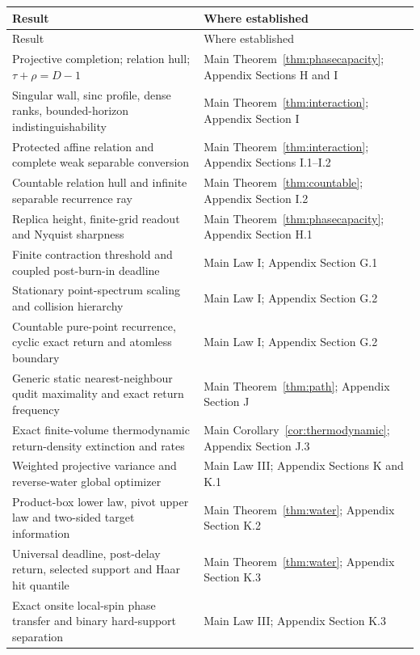 \begin{longtable}{@{}>{\raggedright\arraybackslash}p{}
  >{\raggedright\arraybackslash}p{}@{}}
\toprule
Result & Where established \\
\midrule
\endfirsthead
\toprule
Result & Where established \\
\midrule
\endhead
Projective completion; relation hull; $\tau+\rho=D-1$ & Main
Theorem~\ref{thm:phasecapacity}; Appendix Sections H and I \\
Singular wall, sinc profile, dense ranks, bounded-horizon indistinguishability
& Main Theorem~\ref{thm:interaction}; Appendix Section I \\
Protected affine relation and complete weak separable conversion & Main
Theorem~\ref{thm:interaction}; Appendix Sections I.1--I.2 \\
Countable relation hull and infinite separable recurrence ray & Main
Theorem~\ref{thm:countable}; Appendix Section I.2 \\
Replica height, finite-grid readout and Nyquist sharpness & Main
Theorem~\ref{thm:phasecapacity}; Appendix Section H.1 \\
Finite contraction threshold and coupled post-burn-in deadline & Main Law I;
Appendix Section G.1 \\
Stationary point-spectrum scaling and collision hierarchy & Main Law I;
Appendix Section G.2 \\
Countable pure-point recurrence, cyclic exact return and atomless boundary &
Main Law I; Appendix Section G.2 \\
Generic static nearest-neighbour qudit maximality and exact return frequency &
Main Theorem~\ref{thm:path}; Appendix Section J \\
Exact finite-volume thermodynamic return-density extinction and rates & Main
Corollary~\ref{cor:thermodynamic}; Appendix Section J.3 \\
Weighted projective variance and reverse-water global optimizer & Main Law
III; Appendix Sections K and K.1 \\
Product-box lower law, pivot upper law and two-sided target information & Main
Theorem~\ref{thm:water}; Appendix Section K.2 \\
Universal deadline, post-delay return, selected support and Haar hit quantile
& Main Theorem~\ref{thm:water}; Appendix Section K.3 \\
Exact onsite local-spin phase transfer and binary hard-support separation &
Main Law III; Appendix Section K.3 \\

\end{longtable}

